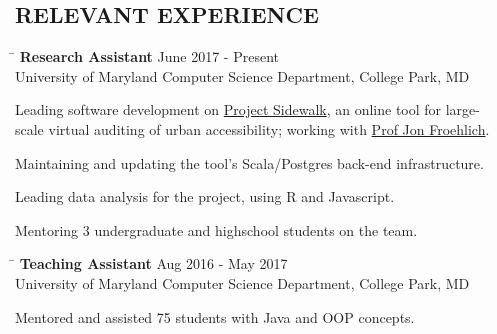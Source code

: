 \documentclass{res}
\begin{document}
\begin{resume}
{  \section{\hspace{0.3in}RELEVANT EXPERIENCE}
    \vspace{-3pt}
    \begin{tabbing}
      \hspace{5.65in}\=  \kill %
      {\bf Research Assistant}
      \>June 2017 - Present\\
      University of Maryland Computer Science Department, College Park, MD\\     
    \end{tabbing}
    \vspace{-24pt}      %
    \begin{list}{\bf{-}}{}
      \setlength{\itemsep}{-2pt}
      \item Leading software development on
            \href{http://sidewalk.umiacs.umd.edu/}{Project Sidewalk}, an online tool for large-\\
            scale virtual auditing of urban accessibility; working with
            \href{http://www.cs.umd.edu/~jonf/}{Prof Jon Froehlich}.
      \item Maintaining and updating the tool's Scala/Postgres back-end infrastructure.
      \item Leading data analysis for the project, using R and Javascript.
      \item Mentoring 3 undergraduate and highschool students on the team.
    \end{list}

    \vspace{-12pt}
    \begin{tabbing}
      \hspace{5.65in}\=  \kill %
      {\bf Teaching Assistant}
      \>Aug 2016 - May 2017\\
      University of Maryland Computer Science Department, College Park, MD\\     
    \end{tabbing}
    \vspace{-24pt}      %
    \begin{list}{\bf{-}}{}
      \setlength{\itemsep}{-2pt}
      \item Mentored and assisted 75 students with Java and OOP concepts.
    \end{list}
    
}
\end{resume}
\end{document}
